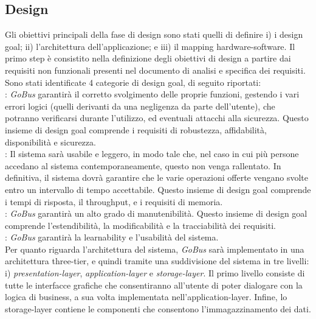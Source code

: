 \subsection{Design}
Gli obiettivi principali della fase di design sono stati quelli di definire i) i design goal; ii) l\rq architettura dell\rq applicazione; e iii) il mapping hardware-software. Il primo step \`{e} consistito nella definizione degli obiettivi di design a partire dai requisiti non funzionali presenti nel documento di analisi e specifica dei requisiti. Sono stati identificate 4 categorie di design goal, di seguito riportati:\\

:  \emph{GoBus} garantir\`{a} il corretto svolgimento delle proprie funzioni, gestendo i vari errori logici (quelli derivanti da una negligenza da parte dell\rq utente), che potranno verificarsi durante l\rq utilizzo, ed eventuali attacchi alla sicurezza. Questo insieme di design goal comprende i requisiti di robustezza, affidabilit\`{a}, disponibilit\`{a} e sicurezza.\\
:  Il sistema sar\`{a} usabile e leggero, in modo tale che, nel caso in cui più persone accedano al sistema contemporaneamente, questo non venga rallentato. In definitiva, il sistema dovr\`{a} garantire che le varie operazioni offerte vengano svolte entro un intervallo di tempo accettabile. Questo insieme di design goal comprende i tempi di risposta, il throughput, e i requisiti di memoria.\\
:  \emph{GoBus} garantir\`{a} un alto grado di manutenibilit\`{a}. Questo insieme di design goal comprende l\rq estendibilit\`{a}, la modificabilit\`{a} e la tracciabilit\`{a} dei requisiti.\\
:  \emph{GoBus} garantir\`{a} la learnability e l\rq usabilit\`{a} del sistema.\\

Per quanto riguarda l\rq architettura del sistema, \emph{GoBus} sar\`{a} implementato in una architettura three-tier, e quindi tramite una suddivisione del sistema in tre livelli: i) \emph{presentation-layer}, \emph{application-layer} e \emph{storage-layer}. Il primo livello consiste di tutte le interfacce grafiche che consentiranno all\rq utente di poter dialogare con la logica di business, a sua volta implementata nell\rq application-layer. Infine, lo storage-layer contiene le componenti che consentono l\rq immagazzinamento dei dati.\\

